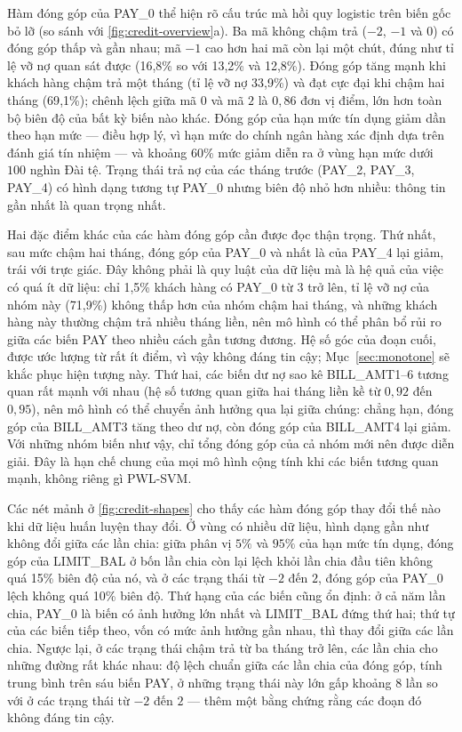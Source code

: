 Hàm đóng góp của PAY\_0 thể hiện rõ cấu trúc mà hồi quy logistic trên biến gốc bỏ lỡ (so sánh với \cref{fig:credit-overview}a). Ba mã không chậm trả ($-2$, $-1$ và $0$) có đóng góp thấp và gần nhau; mã $-1$ cao hơn hai mã còn lại một chút, đúng như tỉ lệ vỡ nợ quan sát được (16{,}8\% so với 13{,}2\% và 12{,}8\%). Đóng góp tăng mạnh khi khách hàng chậm trả một tháng (tỉ lệ vỡ nợ 33{,}9\%) và đạt cực đại khi chậm hai tháng (69{,}1\%); chênh lệch giữa mã $0$ và mã $2$ là $0{,}86$ đơn vị điểm, lớn hơn toàn bộ biên độ của bất kỳ biến nào khác. Đóng góp của hạn mức tín dụng giảm dần theo hạn mức --- điều hợp lý, vì hạn mức do chính ngân hàng xác định dựa trên đánh giá tín nhiệm --- và khoảng 60\% mức giảm diễn ra ở vùng hạn mức dưới $100$ nghìn Đài tệ. Trạng thái trả nợ của các tháng trước (PAY\_2, PAY\_3, PAY\_4) có hình dạng tương tự PAY\_0 nhưng biên độ nhỏ hơn nhiều: thông tin gần nhất là quan trọng nhất.

Hai đặc điểm khác của các hàm đóng góp cần được đọc thận trọng. Thứ nhất, sau mức chậm hai tháng, đóng góp của PAY\_0 và nhất là của PAY\_4 lại giảm, trái với trực giác. Đây không phải là quy luật của dữ liệu mà là hệ quả của việc có quá ít dữ liệu: chỉ 1{,}5\% khách hàng có PAY\_0 từ $3$ trở lên, tỉ lệ vỡ nợ của nhóm này (71{,}9\%) không thấp hơn của nhóm chậm hai tháng, và những khách hàng này thường chậm trả nhiều tháng liền, nên mô hình có thể phân bổ rủi ro giữa các biến PAY theo nhiều cách gần tương đương. Hệ số góc của đoạn cuối, được ước lượng từ rất ít điểm, vì vậy không đáng tin cậy; Mục~\ref{sec:monotone} sẽ khắc phục hiện tượng này. Thứ hai, các biến dư nợ sao kê BILL\_AMT1--6 tương quan rất mạnh với nhau (hệ số tương quan giữa hai tháng liền kề từ $0{,}92$ đến $0{,}95$), nên mô hình có thể chuyển ảnh hưởng qua lại giữa chúng: chẳng hạn, đóng góp của BILL\_AMT3 tăng theo dư nợ, còn đóng góp của BILL\_AMT4 lại giảm. Với những nhóm biến như vậy, chỉ tổng đóng góp của cả nhóm mới nên được diễn giải. Đây là hạn chế chung của mọi mô hình cộng tính khi các biến tương quan mạnh, không riêng gì PWL-SVM.

Các nét mảnh ở \cref{fig:credit-shapes} cho thấy các hàm đóng góp thay đổi thế nào khi dữ liệu huấn luyện thay đổi. Ở vùng có nhiều dữ liệu, hình dạng gần như không đổi giữa các lần chia: giữa phân vị $5\%$ và $95\%$ của hạn mức tín dụng, đóng góp của LIMIT\_BAL ở bốn lần chia còn lại lệch khỏi lần chia đầu tiên không quá 15\% biên độ của nó, và ở các trạng thái từ $-2$ đến $2$, đóng góp của PAY\_0 lệch không quá 10\% biên độ. Thứ hạng của các biến cũng ổn định: ở cả năm lần chia, PAY\_0 là biến có ảnh hưởng lớn nhất và LIMIT\_BAL đứng thứ hai; thứ tự của các biến tiếp theo, vốn có mức ảnh hưởng gần nhau, thì thay đổi giữa các lần chia. Ngược lại, ở các trạng thái chậm trả từ ba tháng trở lên, các lần chia cho những đường rất khác nhau: độ lệch chuẩn giữa các lần chia của đóng góp, tính trung bình trên sáu biến PAY, ở những trạng thái này lớn gấp khoảng 8 lần so với ở các trạng thái từ $-2$ đến $2$ --- thêm một bằng chứng rằng các đoạn đó không đáng tin cậy.

